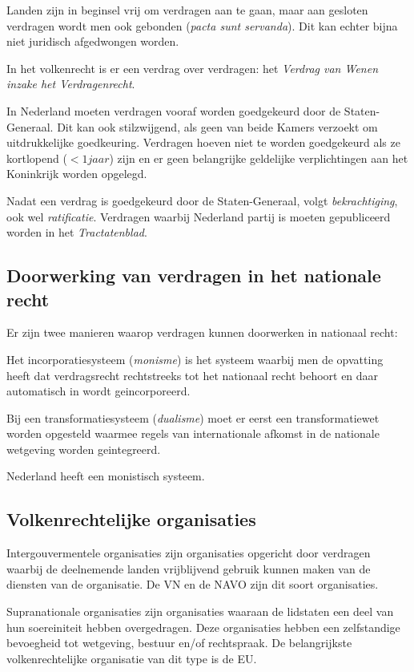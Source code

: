 \documentclass{article}
\begin{document}
Landen zijn in beginsel vrij om verdragen aan te gaan, maar aan gesloten
verdragen wordt men ook gebonden (\emph{pacta sunt servanda}). Dit kan echter
bijna niet juridisch afgedwongen worden.

In het volkenrecht is er een verdrag over verdragen: het \emph{Verdrag van
Wenen inzake het Verdragenrecht}.

In Nederland moeten verdragen vooraf worden goedgekeurd door de
Staten-Generaal. Dit kan ook stilzwijgend, als geen van beide Kamers verzoekt
om uitdrukkelijke goedkeuring. Verdragen hoeven niet te worden goedgekeurd als
ze kortlopend ($<1 jaar$) zijn en er geen belangrijke geldelijke verplichtingen
aan het Koninkrijk worden opgelegd.

Nadat een verdrag is goedgekeurd door de Staten-Generaal, volgt
\emph{bekrachtiging}, ook wel \emph{ratificatie}. Verdragen waarbij Nederland
partij is moeten gepubliceerd worden in het \emph{Tractatenblad}.

\subsection{Doorwerking van verdragen in het nationale recht}

Er zijn twee manieren waarop verdragen kunnen doorwerken in nationaal recht:

Het incorporatiesysteem (\emph{monisme}) is het systeem waarbij men de opvatting
heeft dat verdragsrecht rechtstreeks tot het nationaal recht behoort en daar
automatisch in wordt geincorporeerd.

Bij een transformatiesysteem (\emph{dualisme}) moet er eerst een transformatiewet
worden opgesteld waarmee regels van internationale afkomst in de nationale wetgeving
worden geintegreerd.

Nederland heeft een monistisch systeem.

\subsection{Volkenrechtelijke organisaties}

Intergouvermentele organisaties zijn organisaties opgericht door verdragen waarbij
de deelnemende landen vrijblijvend gebruik kunnen maken van de diensten van de
organisatie. De VN en de NAVO zijn dit soort organisaties.

Supranationale organisaties zijn organisaties waaraan de lidstaten een deel van
hun soereiniteit hebben overgedragen. Deze organisaties hebben een zelfstandige
bevoegheid tot wetgeving, bestuur en/of rechtspraak. De belangrijkste volkenrechtelijke
organisatie van dit type is de EU.
\end{document}
